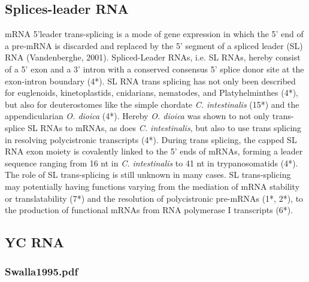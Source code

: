 \documentclass[graybox]{svmult}
\begin{document}
\subsection{Splices-leader RNA}
mRNA 5’leader trans-splicing is a mode of gene expression in which the 5’ end 
of a pre-mRNA is discarded and replaced by the 5’ segment of a spliced leader 
(SL) RNA (Vandenberghe, 2001). Spliced-Leader RNAs, i.e. SL RNAs, hereby 
consist of a 5’ exon and a 3’ intron with a conserved consensus 5’ splice donor 
site at the exon-intron boundary (4*). SL RNA trans splicing has not only been 
described for euglenoids, kinetoplastids, cnidarians, nematodes, and 
Platyhelminthes (4*), but also for deuterostomes like the simple chordate 
\textit{C. intestinalis} (15*) and the appendicularian \textit{O. dioica} (4*). 
Hereby \textit{O. dioica} was shown to not only trans-splice SL RNAs to mRNAs, 
as does \textit{C. intestinalis}, but also to use trans splicing in resolving 
polycistronic transcripts (4*). During trans splicing, the capped SL RNA exon 
moiety is covalently linked to the 5’ ends of mRNAs, forming a leader sequence 
ranging from 16 nt in \textit{C. intestinalis} to 41 nt in trypanosomatids 
(4*). The role of SL trans-splicing is still unknown in many cases. SL 
trans-splicing may potentially having functions varying from the mediation of 
mRNA stability or translatability (7*) and the resolution of polycistronic 
pre-mRNAs (1*, 2*), to the production of functional mRNAs from RNA polymerase I 
transcripts (6*).


\subsection{YC RNA}
\subsubsection{Swalla1995.pdf}
\end{document}
